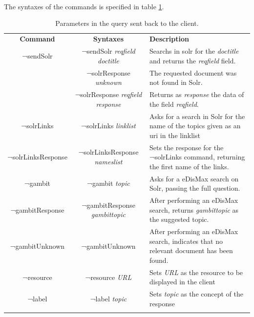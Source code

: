 The syntaxes of the commands is specified in table \ref{tab:oob-commands}.
\begin{center}
  \centering
  \begin{table}
    \begin{tabular*}{0.7\textwidth}{@{\extracolsep{\fill}} | c | c | p{} |}
      \hhline{|-|-|-|}
      \textbf{Command} & \textbf{Syntaxes} & \textbf{Description} \\ \hhline{|=|=|=|}
      ¬sendSolr & ¬sendSolr \textit{reqfield} \textit{doctitle} & Searchs in solr for the \textit{doctitle} and returns the \textit{reqfield} field.  \\ \hhline{|-|-|-|}
      \multirow{2}{*}{¬solrResponse} & ¬solrResponse \textit{unknown} & The requested document was not found in Solr. \\ \cline{2-3}
				     & ¬solrResponse \textit{reqfield} \textit{response} & Returns as \textit{response} the data of the field \textit{reqfield}. \\ \hhline{|-|-|-|}
      ¬solrLinks & ¬solrLinks \textit{linklist} & Asks for a search in Solr for the name of the topics given as an uri in the linklist \\ \hhline{|-|-|-|}
      ¬solrLinksResponse & ¬solrLinksResponse \textit{nameslist} & Sets the response for the ¬solrLinks command, returning the first name of the links. \\ \hhline{|-|-|-|}
      ¬gambit & ¬gambit \textit{topic}& Asks for a eDisMax search on Solr, passing the full question. \\ \hhline{|-|-|-|}
      ¬gambitResponse & ¬gambitResponse \textit{gambittopic} & After performing an eDisMax search, returns \textit{gambittopic} as the suggested topic. \\ \hhline{|-|-|-|}
      ¬gambitUnknown & ¬gambitUnknown & After performing an eDisMax search, indicates that no relevant document has been found. \\ \hhline{|-|-|-|}
      ¬resource & ¬resource \textit{URL} & Sets \textit{URL} as the resource to be displayed in the client \\ \hhline{|-|-|-|}
      ¬label & ¬label \textit{topic} & Sets \textit{topic} as the concept of the response \\ \hhline{|-|-|-|}
      \end{tabular*}
    \caption{Parameters in the query sent back to the client.}
    \label{tab:oob-commands}
  \end{table}
\end{center}

